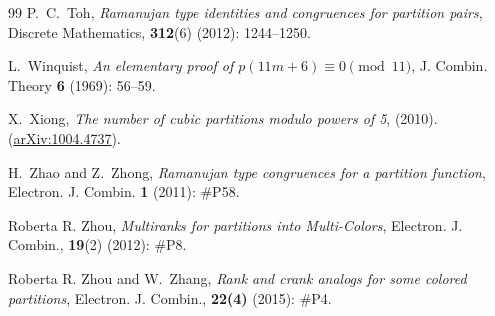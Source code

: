 \documentclass[12pt]{amsart}
\numberwithin{equation}{section}
\theoremstyle{plain}
\theoremstyle{definition}
\begin{document}
\begin{thebibliography}{99}
P.~C.~Toh, \emph{Ramanujan type identities and congruences for partition pairs}, Discrete Mathematics, {\bf 312}(6) (2012): 1244--1250.

L.~Winquist, \emph{An elementary proof of $p(11m+6)\equiv 0 \pmod{11}$}, J. Combin. Theory {\bf 6} (1969): 56--59.

X.~Xiong, \emph{The number of cubic partitions modulo powers of 5}, (2010). (\href{http://arxiv.org/abs/1004.4737}{arXiv:1004.4737}).

H.~Zhao and Z.~Zhong, \emph{Ramanujan type congruences for a partition function}, Electron. J. Combin. \textbf{1} (2011): \#P58.

Roberta R. Zhou, \emph{Multiranks for partitions into Multi-Colors}, Electron. J. Combin., {\bf 19}(2) (2012): \#P8.

Roberta R. Zhou and W.~Zhang, \emph{Rank and crank analogs for some colored partitions}, Electron. J. Combin., \textbf{22(4)} (2015): \#P4.



\end{thebibliography}
\end{document}
